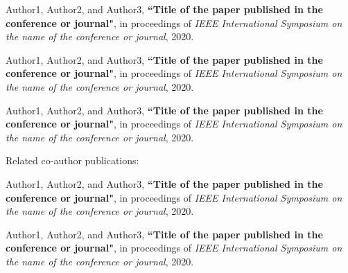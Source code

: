 \begin{enumerate}[label={[P\arabic*]}]  
    \item Author1, Author2, and Author3, \textbf{``Title of the paper published in the conference or journal"}, in proceedings of {\it IEEE International Symposium on the name of the conference or journal}, 2020.
    
    \item Author1, Author2, and Author3, \textbf{``Title of the paper published in the conference or journal"}, in proceedings of {\it IEEE International Symposium on the name of the conference or journal}, 2020.

    \item Author1, Author2, and Author3, \textbf{``Title of the paper published in the conference or journal"}, in proceedings of {\it IEEE International Symposium on the name of the conference or journal}, 2020.
    
\end{enumerate}
\noindent
Related co-author publications:
\begin{enumerate}[start=3,label={[P\arabic*]}]
    \item Author1, Author2, and Author3, \textbf{``Title of the paper published in the conference or journal"}, in proceedings of {\it IEEE International Symposium on the name of the conference or journal}, 2020.
    
    \item Author1, Author2, and Author3, \textbf{``Title of the paper published in the conference or journal"}, in proceedings of {\it IEEE International Symposium on the name of the conference or journal}, 2020.

\end{enumerate}